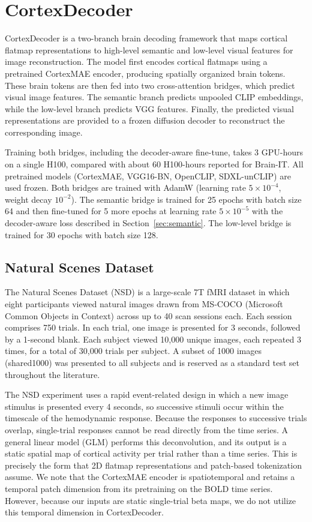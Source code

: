 \documentclass[conference]{IEEEtran}
\begin{document}
\section{CortexDecoder}
\label{sec:cortex_decoder}
CortexDecoder is a two-branch brain decoding framework that maps cortical flatmap representations to high-level semantic and low-level visual features for image reconstruction. The model first encodes cortical flatmaps using a pretrained CortexMAE encoder, producing spatially organized brain tokens. These brain tokens are then fed into two cross-attention bridges, which predict visual image features. The semantic branch predicts unpooled CLIP embeddings, while the low-level branch predicts VGG features. Finally, the predicted visual representations are provided to a frozen diffusion decoder to reconstruct the corresponding image.

Training both bridges, including the decoder-aware fine-tune, takes 3 GPU-hours on a single H100, compared with about 60 H100-hours reported for Brain-IT. All pretrained models (CortexMAE, VGG16-BN, OpenCLIP, SDXL-unCLIP) are used frozen. Both bridges are trained with AdamW (learning rate $5\times10^{-4}$, weight decay $10^{-2}$). The semantic bridge is trained for 25 epochs with batch size 64 and then fine-tuned for 5 more epochs at learning rate $5\times10^{-5}$ with the decoder-aware loss described in Section~\ref{sec:semantic}. The low-level bridge is trained for 30 epochs with batch size 128.

\subsection{Natural Scenes Dataset}
The Natural Scenes Dataset (NSD) is a large-scale 7T fMRI dataset in which eight participants viewed natural images drawn from MS-COCO (Microsoft Common Objects in Context) \cite{lin2015microsoftcococommonobjects} across up to 40 scan sessions each. Each session comprises 750 trials. In each trial, one image is presented for 3 seconds, followed by a 1-second blank. Each subject viewed 10,000 unique images, each repeated 3 times, for a total of 30,000 trials per subject. A subset of 1000 images (shared1000) was presented to all subjects and is reserved as a standard test set throughout the literature.

The NSD experiment uses a rapid event-related design in which a new image stimulus is presented every 4 seconds, so successive stimuli occur within the timescale of the hemodynamic response. Because the responses to successive trials overlap, single-trial responses cannot be read directly from the time series. A general linear model (GLM) \cite{10.7554/eLife.77599} performs this deconvolution, and its output is a static spatial map of cortical activity per trial rather than a time series. This is precisely the form that 2D flatmap representations and patch-based tokenization assume. We note that the CortexMAE encoder is spatiotemporal and retains a temporal patch dimension from its pretraining on the BOLD time series. However, because our inputs are static single-trial beta maps, we do not utilize this temporal dimension in CortexDecoder.
\end{document}
